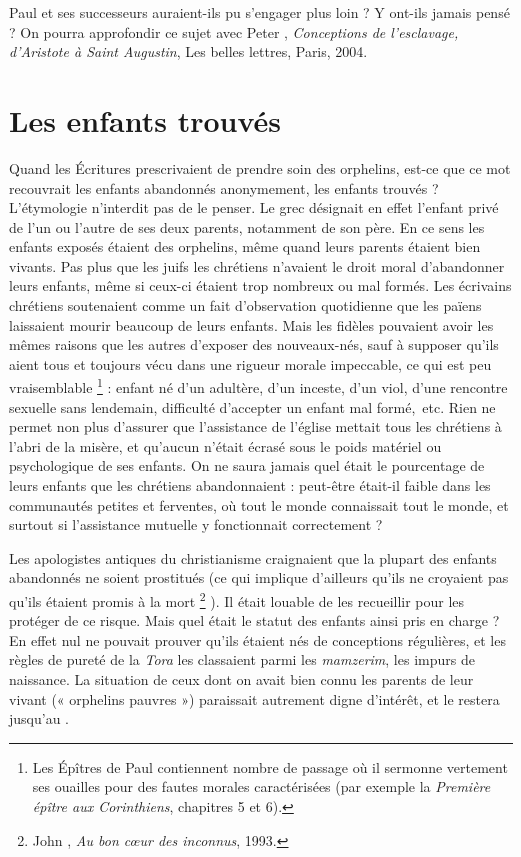  Paul et ses successeurs auraient-ils pu s'engager plus loin ? Y ont-ils jamais pensé ?  On pourra approfondir ce sujet avec Peter , \emph{Conceptions de l'esclavage, d'Aristote à Saint Augustin}, Les belles lettres, Paris, 2004.

\section{Les enfants trouvés}

Quand les Écritures prescrivaient de prendre soin des orphelins, est-ce que ce mot recouvrait les enfants abandonnés anonymement, les enfants trouvés ? L'étymologie n'interdit pas de le penser. Le grec  désignait en effet l'enfant privé de l'un ou l'autre de ses deux parents, notamment de son père. En ce sens les enfants exposés étaient des orphelins, même quand leurs parents étaient bien vivants. Pas plus que les juifs les chrétiens n'avaient le droit moral d'abandonner leurs enfants, même si ceux-ci étaient trop nombreux ou mal formés. Les écrivains chrétiens soutenaient comme un fait d'observation quotidienne que les païens laissaient mourir beaucoup de leurs enfants. Mais les fidèles pouvaient avoir les mêmes raisons que les autres d'exposer des nouveaux-nés, sauf à supposer qu'ils aient tous et toujours vécu dans une rigueur morale impeccable, ce qui est peu vraisemblable%
\footnote{Les Épîtres de Paul contiennent nombre de passage où il sermonne vertement ses ouailles pour des fautes morales caractérisées (par exemple la \emph{Première épître aux Corinthiens}, chapitres 5 et 6).} 
: enfant né d'un adultère, d'un inceste, d'un viol, d'une rencontre sexuelle sans lendemain, difficulté d'accepter un enfant mal formé,~etc. Rien ne permet non plus d'assurer que l'assistance de l'église mettait tous les chrétiens à l'abri de la misère, et qu'aucun n'était écrasé sous le poids matériel ou psychologique de ses enfants. On ne saura jamais quel était le pourcentage de leurs enfants que les chrétiens abandonnaient : peut-être était-il faible dans les communautés petites et ferventes, où tout le monde connaissait tout le monde, et surtout si l'assistance mutuelle y fonctionnait correctement ? 

 Les apologistes antiques du christianisme craignaient que la plupart des enfants abandonnés ne soient prostitués (ce qui implique d'ailleurs qu'ils ne croyaient pas qu'ils étaient promis à la mort%
\footnote{John , \emph{Au bon cœur des inconnus}, 1993.}%
). Il était louable de les recueillir pour les protéger de ce risque. Mais quel était le statut des enfants ainsi pris en charge ? En effet nul ne pouvait prouver qu'ils étaient nés de conceptions régulières, et les règles de pureté de la \emph{Tora} les classaient parmi les \emph{mamzerim}, les impurs de naissance. La situation de ceux dont on avait bien connu les parents de leur vivant (« orphelins pauvres ») paraissait autrement digne d'intérêt, et le restera jusqu'au . 

